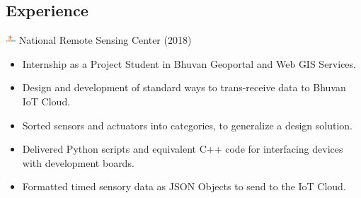 \documentclass{article}
\begin{document}
\begin{multicols}{2}
\section*{Experience}
\includegraphics[width=14px]{isro.png} National Remote Sensing Center (2018)
\begin{itemize}
\item \small Internship as a Project Student in Bhuvan Geoportal and Web GIS Services.
\item \small Design and development of standard ways to trans-receive data to Bhuvan IoT Cloud.
\item \small Sorted sensors and actuators into categories, to generalize a design solution.
\item \small Delivered Python scripts and equivalent C++ code for interfacing devices with development boards.
\item \small Formatted timed sensory data as JSON Objects to send to the IoT Cloud. 
\end{itemize}


\end{multicols}
\end{document}
